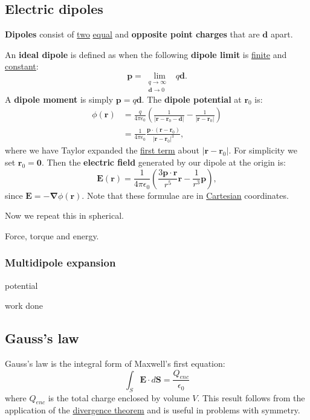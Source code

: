 \documentclass{article}
\begin{document}
\newpage

\subsection{Electric dipoles}
\textbf{Dipoles} consist of \underline{two} \underline{equal} and \textbf{opposite point charges} that are $\boldsymbol{d}$ apart. 

An \textbf{ideal dipole} is defined as when the following \textbf{dipole limit} is \underline{finite} and \underline{constant}:
$$\boldsymbol{p}=\lim_{\begin{smallmatrix} q\to\infty & \\ \boldsymbol{d}\to 0 \end{smallmatrix}} q\boldsymbol{d}.$$
A \textbf{dipole moment} is simply $\boldsymbol{p}=q\boldsymbol{d}$. The \textbf{dipole potential} at $\boldsymbol{r}_0$ is:
\begin{align*}
    \phi(\boldsymbol{r})
    &= \frac{q}{4\pi\epsilon_0}\left(\frac{1}{|\boldsymbol{r}-\boldsymbol{r}_0-\boldsymbol{d}|}-\frac{1}{|\boldsymbol{r}-\boldsymbol{r}_0|}\right)\\
    &=\frac{1}{4\pi\epsilon_0}\frac{\boldsymbol{p}\cdot(\boldsymbol{r}-\boldsymbol{r}_0)}{|\boldsymbol{r}-\boldsymbol{r}_0|^3},
\end{align*}
where we have Taylor expanded the \underline{first term} about $|\boldsymbol{r}-\boldsymbol{r}_0|$. For simplicity we set $\boldsymbol{r}_0=\boldsymbol{0}$. Then the \textbf{electric field} generated by our dipole at the origin is:
$$\boldsymbol{E}(\boldsymbol{r})=\frac{1}{4\pi\epsilon_0}\left(\frac{3\boldsymbol{p}\cdot\boldsymbol{r}}{r^5} \boldsymbol{r}-\frac{1}{r^3} \boldsymbol{p}\right),$$
since $\boldsymbol{E}=-\boldsymbol{\nabla}\phi(\boldsymbol{r})$. Note that these formulae are in \underline{Cartesian} coordinates.

Now we repeat this in spherical.

Force, torque and energy.

\subsubsection{Multidipole expansion}

potential

work done

\newpage

\subsection{Gauss's law}
Gauss's law is the integral form of Maxwell's first equation:
$$\int_S\boldsymbol{E}\cdot d\boldsymbol{S}
=\frac{Q_{enc}}{\epsilon_0}$$
where $Q_{enc}$ is the total charge enclosed by volume $V$. This result follows from the application of the \underline{divergence theorem} and is useful in problems with symmetry. 
\end{document}
